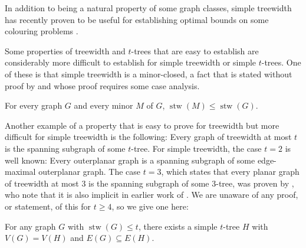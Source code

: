 \documentclass[kpfonts]{patmorin}
\DeclareMathOperator{\stw}{stw}
\theoremstyle{named}
\begin{document}
In addition to being a natural property of some graph classes, simple treewidth has recently proven to be useful for establishing optimal bounds on some colouring problems \cite{bose.dujmovic.ea:asymptotically}.

Some properties of treewidth and $t$-trees that are easy to establish are considerably more difficult to establish for simple treewidth or simple $t$-trees.  One of these is that simple treewidth is a minor-closed, a fact that is stated without proof by \citet{knauer.ueckerdt:simple} and whose proof requires some case analysis.

\begin{lem}\label{simple-minor-closed}
    For every graph $G$ and every minor $M$ of $G$, $\stw(M)\le\stw(G)$.
\end{lem}


Another example of a property that is easy to prove for treewidth but more difficult for simple treewidth is the following:  Every graph of treewidth at most $t$ is the spanning subgraph of some $t$-tree.  For simple treewidth, the case $t=2$ is well known: Every outerplanar graph is a spanning subgraph of some edge-maximal outerplanar graph.  The case $t=3$, which states that every planar graph of treewidth at most 3 is the spanning subgraph of some $3$-tree, was proven by \citet{kratochvil.vaner:note}, who note that it is also implicit in earlier work of \citet{elmallah.colbourn:on}.  We are unaware of any proof, or statement, of this for $t\ge 4$, so we give one here:

\begin{lem}\label{simple-subgraph}
    For any graph $G$ with $\stw(G)\le t$, there exists a simple $t$-tree $H$ with $V(G)= V(H)$ and $E(G)\subseteq E(H)$.
\end{lem}
\end{document}
